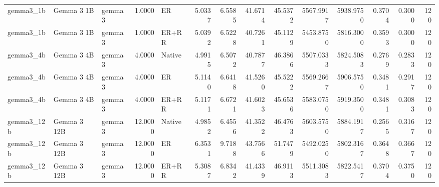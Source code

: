 \begin{tabular}{lllrlrrrrrrrrr}
gemma3_1b & Gemma 3 1B & gemma3 & 1.0000 & ER & 5.0337 & 6.5585 & 41.6714 & 45.5372 & 5567.9917 & 5938.9750 & 0.3704 & 0.3000 & 120 \\
gemma3_1b & Gemma 3 1B & gemma3 & 1.0000 & ER+RR & 5.0392 & 6.5228 & 40.7261 & 45.1129 & 5453.8750 & 5816.3000 & 0.3593 & 0.3000 & 120 \\
gemma3_4b & Gemma 3 4B & gemma3 & 4.0000 & Native & 4.9915 & 6.5072 & 40.7877 & 46.3866 & 5507.0333 & 5824.5083 & 0.2769 & 0.2833 & 120 \\
gemma3_4b & Gemma 3 4B & gemma3 & 4.0000 & ER & 5.1140 & 6.6418 & 41.5260 & 45.5222 & 5569.2667 & 5906.5750 & 0.3481 & 0.2917 & 120 \\
gemma3_4b & Gemma 3 4B & gemma3 & 4.0000 & ER+RR & 5.1171 & 6.6721 & 41.6023 & 45.6536 & 5583.0750 & 5919.3500 & 0.3481 & 0.3083 & 120 \\
gemma3_12b & Gemma 3 12B & gemma3 & 12.0000 & Native & 4.9852 & 6.4556 & 41.3522 & 46.4763 & 5603.5750 & 5884.1917 & 0.2565 & 0.3167 & 120 \\
gemma3_12b & Gemma 3 12B & gemma3 & 12.0000 & ER & 6.3531 & 9.7188 & 43.7566 & 51.7479 & 5492.0250 & 5802.3167 & 0.3648 & 0.3667 & 120 \\
gemma3_12b & Gemma 3 12B & gemma3 & 12.0000 & ER+RR & 5.3087 & 6.8342 & 41.4339 & 46.9113 & 5511.3083 & 5822.5417 & 0.3704 & 0.3750 & 120 \\
\bottomrule
\end{tabular}
